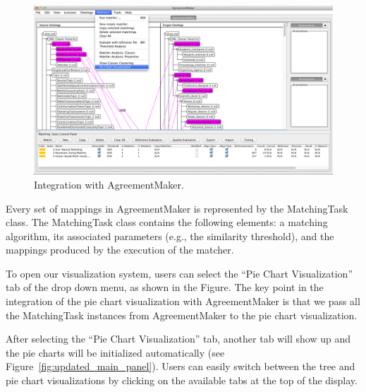 \begin{figure}[htb]
	\centering
	\includegraphics[width=6.5in]{pics/Integrate.png}
	\caption{Integration with AgreementMaker.}
	\label{fig:integrating}
\end{figure} 

Every set of mappings in AgreementMaker is represented by the
MatchingTask class. The MatchingTask class contains the following
elements: a matching algorithm, its associated parameters (e.g.,
the similarity threshold), and the mappings produced by the execution
of the matcher. 

To open our visualization system, users can select the “Pie Chart
Visualization” tab of the drop down menu, as shown in the Figure. The
key point in the integration of the pie chart visualization with AgreementMaker is that we pass all the MatchingTask instances from AgreementMaker to the pie chart visualization.

After selecting the “Pie Chart Visualization” tab, another tab will
show up and the pie charts will be initialized automatically (see
Figure~\ref{fig:updated_main_panel}). Users can easily switch between the
tree and pie chart visualizations by clicking on the available tabs at
the top of the display.



